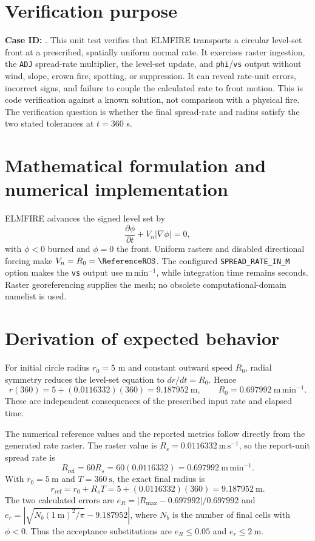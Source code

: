 \section{Verification purpose}

\textbf{Case ID:} \texttt{\CaseID}. This unit test verifies that ELMFIRE transports a circular level-set front at a prescribed, spatially uniform normal rate. It exercises raster ingestion, the \texttt{ADJ} spread-rate multiplier, the level-set update, and \texttt{phi}/\texttt{vs} output without wind, slope, crown fire, spotting, or suppression. It can reveal rate-unit errors, incorrect signs, and failure to couple the calculated rate to front motion. This is code verification against a known solution, not comparison with a physical fire. The verification question is whether the final spread-rate and radius satisfy the two stated tolerances at \(t=360\) s.

\section{Mathematical formulation and numerical implementation}

ELMFIRE advances the signed level set by
\[
 \frac{\partial\phi}{\partial t}+V_n|\nabla\phi|=0,
\]
with \(\phi<0\) burned and \(\phi=0\) the front. Uniform rasters and disabled directional forcing make \(V_n=R_0=\ReferenceROS\). The configured \texttt{SPREAD\_RATE\_IN\_M} option makes the \texttt{vs} output use \(\mathrm{m\,min^{-1}}\), while integration time remains seconds. Raster georeferencing supplies the mesh; no obsolete computational-domain namelist is used.

\section{Derivation of expected behavior}

For initial circle radius \(r_0=5\) m and constant outward speed \(R_0\), radial symmetry reduces the level-set equation to \(dr/dt=R_0\). Hence
\[
 r(360)=5+(0.0116332)(360)=9.187952~\mathrm{m},
 \qquad R_0=0.697992~\mathrm{m\,min^{-1}}.
\]
These are independent consequences of the prescribed input rate and elapsed time.

The numerical reference values and the reported metrics follow directly from the generated rate raster.  The raster value is \(R_s=0.0116332~\mathrm{m\,s^{-1}}\), so the report-unit spread rate is
\[
 R_{\mathrm{ref}}=60R_s=60(0.0116332)=0.697992~\mathrm{m\,min^{-1}}.
\]
With \(r_0=5~\mathrm{m}\) and \(T=360~\mathrm{s}\), the exact final radius is
\[
 r_{\mathrm{ref}}=r_0+R_sT=5+(0.0116332)(360)=9.187952~\mathrm{m}.
\]
The two calculated errors are \(e_R=|R_{\max}-0.697992|/0.697992\) and
\(e_r=|\sqrt{N_b(1~\mathrm{m})^2/\pi}-9.187952|\), where \(N_b\) is the
number of final cells with \(\phi<0\).  Thus the acceptance substitutions are
\(e_R\leq0.05\) and \(e_r\leq2~\mathrm{m}\).

